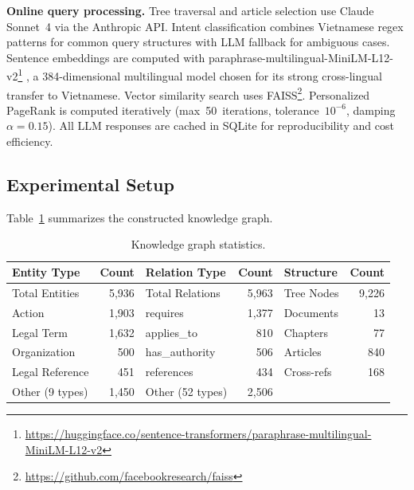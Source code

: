 \documentclass{IOS-Book-Article}
\begin{document}
\textbf{Online query processing.} Tree traversal and article selection use Claude Sonnet~4 via the Anthropic API. Intent classification combines Vietnamese regex patterns for common query structures with LLM fallback for ambiguous cases. Sentence embeddings are computed with paraphrase-multilingual-MiniLM-L12-v2\footnote{\url{https://huggingface.co/sentence-transformers/paraphrase-multilingual-MiniLM-L12-v2}} \cite{r2}, a 384-dimensional multilingual model chosen for its strong cross-lingual transfer to Vietnamese. Vector similarity search uses FAISS\footnote{\url{https://github.com/facebookresearch/faiss}}. Personalized PageRank is computed iteratively (max~50~iterations, tolerance~$10^{-6}$, damping~$\alpha{=}0.15$). All LLM responses are cached in SQLite for reproducibility and cost efficiency.

\subsection{Experimental Setup}

Table~\ref{tab:kg-stats} summarizes the constructed knowledge graph.

\begin{table}[H]
\centering\footnotesize
\caption{Knowledge graph statistics.}
\label{tab:kg-stats}
\begin{tabular}{lr@{\hskip 1.2cm}lr@{\hskip 1.2cm}lr}
\toprule
\textbf{Entity Type} & \textbf{Count} & \textbf{Relation Type} & \textbf{Count} & \textbf{Structure} & \textbf{Count} \\
\midrule
Total Entities & 5,936 & Total Relations & 5,963 & Tree Nodes & 9,226 \\
Action & 1,903 & requires & 1,377 & Documents & 13 \\
Legal Term & 1,632 & applies\_to & 810 & Chapters & 77 \\
Organization & 500 & has\_authority & 506 & Articles & 840 \\
Legal Reference & 451 & references & 434 & Cross-refs & 168 \\
Other (9 types) & 1,450 & Other (52 types) & 2,506 & & \\
\bottomrule
\end{tabular}
\end{table}
\end{document}
